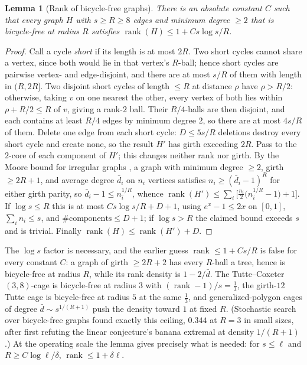 \documentclass[11pt]{article}
\newtheorem{lemma}{Lemma}
\theoremstyle{remark}
\begin{document}
\begin{lemma}[Rank of bicycle-free graphs]\label{lem:rank}
There is an absolute constant $C$ such that every graph $H$ with
$s\ge R\ge8$ edges and minimum degree $\ge2$ that is bicycle-free at
radius $R$ satisfies
$\operatorname{rank}(H)\le1+Cs\log s/R$.
\end{lemma}

\begin{proof}
Call a cycle \emph{short} if its length is at most $2R$. Two short
cycles cannot share a vertex, since both would lie in that vertex's
$R$-ball; hence short cycles are pairwise vertex- and edge-disjoint,
and there are at most $s/R$ of them with length in $(R,2R]$. Two
disjoint short cycles of length $\le R$ at distance $\rho$ have
$\rho>R/2$: otherwise, taking $v$ on one nearest the other, every
vertex of both lies within $\rho+R/2\le R$ of $v$, giving a rank-$2$
ball. Their $R/4$-balls are then disjoint, and each contains at least
$R/4$ edges by minimum degree $2$, so there are at most $4s/R$ of
them. Delete one edge from each short cycle: $D\le5s/R$ deletions
destroy every short cycle and create none, so the result $H'$ has
girth exceeding $2R$. Pass to the $2$-core of each component of $H'$;
this changes neither rank nor girth. By the Moore bound for irregular
graphs \cite{ahl02}, a graph with minimum degree $\ge2$, girth
$\ge2R+1$, and average degree $\bar d_i$ on $n_i$ vertices satisfies
$n_i\ge(\bar d_i-1)^{R}$ for either girth parity, so
$\bar d_i-1\le n_i^{1/R}$, whence
$\operatorname{rank}(H')\le\sum_i\big[\tfrac{n_i}2\big(n_i^{1/R}-1\big)+1\big]$.
If $\log s\le R$ this is at most $Cs\log s/R+D+1$, using
$e^{x}-1\le2x$ on $[0,1]$, $\sum_in_i\le s$, and
$\#\mathrm{components}\le D+1$; if $\log s>R$ the claimed bound
exceeds $s$ and is trivial. Finally
$\operatorname{rank}(H)\le\operatorname{rank}(H')+D$.
\end{proof}

The $\log s$ factor is necessary, and the earlier guess
$\operatorname{rank}\le1+Cs/R$ is false for every constant $C$: a
graph of girth $\ge2R+2$ has every $R$-ball a tree, hence is
bicycle-free at radius $R$, while its rank density is $1-2/\bar d$.
The Tutte--Coxeter $(3,8)$-cage is bicycle-free at radius $3$ with
$(\operatorname{rank}-1)/s=\tfrac13$, the girth-$12$ Tutte cage is
bicycle-free at radius $5$ at the same $\tfrac13$, and
generalized-polygon cages of degree $\bar d\sim s^{1/(R+1)}$ push the
density toward $1$ at fixed $R$. (Stochastic search over bicycle-free
graphs found exactly this ceiling, $0.344$ at $R=3$ in small sizes,
after first refuting the linear conjecture's banana extremal at
density $1/(R+1)$.) At the operating scale the lemma gives precisely
what is needed: for $s\le\ell$ and $R\ge C\log\ell/\delta$,
$\operatorname{rank}\le1+\delta\ell$.
\end{document}
